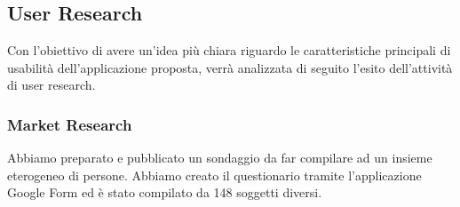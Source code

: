 \subsection{User Research}
Con l'obiettivo di avere un'idea più chiara riguardo le caratteristiche
principali di usabilità dell'applicazione proposta, verrà analizzata di
seguito l'esito dell'attività di user research.

\subsubsection{Market Research}
Abbiamo preparato e pubblicato un sondaggio da far compilare ad un
insieme eterogeneo di persone. Abbiamo creato il questionario tramite
l'applicazione Google Form ed è stato compilato da 148
soggetti diversi.\\

